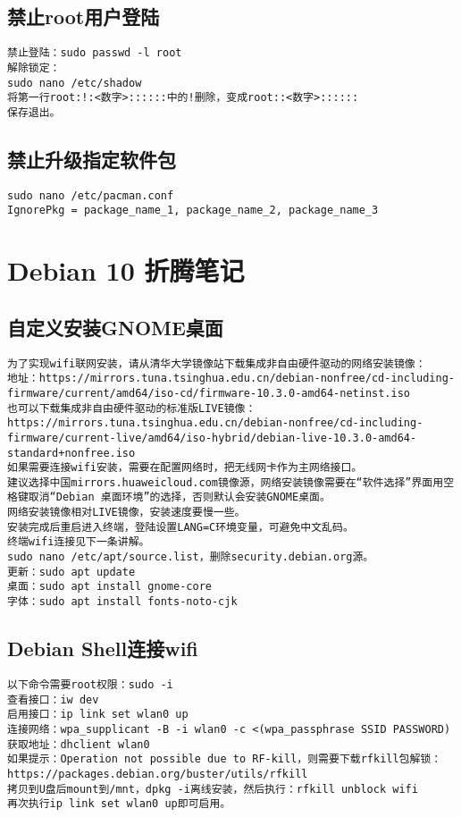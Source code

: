 \documentclass[a4paper,fontset=fandol,zihao=-4,linespread=1.2,oneside]{ctexbook}
\begin{document}
\section{禁止root用户登陆}
\begin{lstlisting}
禁止登陆：sudo passwd -l root
解除锁定：
sudo nano /etc/shadow
将第一行root:!:<数字>::::::中的!删除，变成root::<数字>::::::
保存退出。
\end{lstlisting}

\section{禁止升级指定软件包}
\begin{lstlisting}
sudo nano /etc/pacman.conf
IgnorePkg = package_name_1, package_name_2, package_name_3
\end{lstlisting}


\chapter{Debian 10 折腾笔记}

\section{自定义安装GNOME桌面}
\begin{lstlisting}
为了实现wifi联网安装，请从清华大学镜像站下载集成非自由硬件驱动的网络安装镜像：
地址：https://mirrors.tuna.tsinghua.edu.cn/debian-nonfree/cd-including-firmware/current/amd64/iso-cd/firmware-10.3.0-amd64-netinst.iso
也可以下载集成非自由硬件驱动的标准版LIVE镜像：
https://mirrors.tuna.tsinghua.edu.cn/debian-nonfree/cd-including-firmware/current-live/amd64/iso-hybrid/debian-live-10.3.0-amd64-standard+nonfree.iso
如果需要连接wifi安装，需要在配置网络时，把无线网卡作为主网络接口。
建议选择中国mirrors.huaweicloud.com镜像源，网络安装镜像需要在“软件选择”界面用空格键取消“Debian 桌面环境”的选择，否则默认会安装GNOME桌面。
网络安装镜像相对LIVE镜像，安装速度要慢一些。
安装完成后重启进入终端，登陆设置LANG=C环境变量，可避免中文乱码。
终端wifi连接见下一条讲解。
sudo nano /etc/apt/source.list，删除security.debian.org源。
更新：sudo apt update
桌面：sudo apt install gnome-core
字体：sudo apt install fonts-noto-cjk
\end{lstlisting}

\section{Debian Shell连接wifi}
\begin{lstlisting}
以下命令需要root权限：sudo -i
查看接口：iw dev
启用接口：ip link set wlan0 up
连接网络：wpa_supplicant -B -i wlan0 -c <(wpa_passphrase SSID PASSWORD)
获取地址：dhclient wlan0
如果提示：Operation not possible due to RF-kill，则需要下载rfkill包解锁：https://packages.debian.org/buster/utils/rfkill
拷贝到U盘后mount到/mnt，dpkg -i离线安装，然后执行：rfkill unblock wifi
再次执行ip link set wlan0 up即可启用。
\end{lstlisting}
\end{document}
